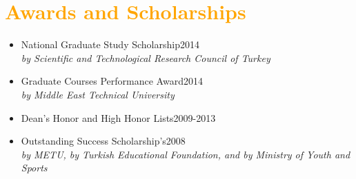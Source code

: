 \documentclass[letterpaper,11pt]{article}
\begin{document}
\section{\textcolor{Orange}{Awards and Scholarships}}
\begin{itemize}[itemsep=.001em] 
	\item[]  National Graduate Study Scholarship\hfill 2014\\
	\hspace*{1.8em}\emph{by Scientific and Technological Research Council of Turkey}
	\item[]  Graduate Courses Performance Award\hfill 2014\\
		\hspace*{1.8em}\emph{by Middle East Technical University}	
	\item[] Dean’s Honor and High Honor Lists\hfill 2009-2013

	\item[] Outstanding Success Scholarship's\hfill 2008\\
		\hspace*{1.8em}\emph{by METU, by Turkish Educational Foundation, and by Ministry of Youth and Sports}
\end{itemize}
\end{document}
